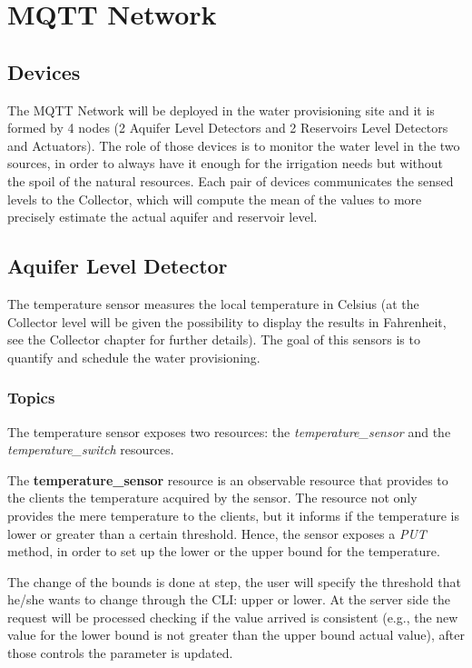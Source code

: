 \section{MQTT Network}

\subsection{Devices}
The MQTT Network will be deployed in the water provisioning site and it is formed by 4 nodes (2 Aquifer Level Detectors and 2 Reservoirs Level Detectors and Actuators). The role of those devices is to monitor the water level in the two sources, in order to always have it enough for the irrigation needs but without the spoil of the natural resources. Each pair of devices communicates the sensed levels  to the Collector, which will compute the mean of the values to more precisely estimate the actual aquifer and reservoir level.


\subsection{Aquifer Level Detector}
The temperature sensor measures the local temperature in Celsius (at the Collector level will be given the possibility to display the results in Fahrenheit, see the Collector chapter for further details). The goal of this sensors is to quantify and schedule the water provisioning.

\subsubsection{Topics}
The temperature sensor exposes two resources: the \textit{temperature\_sensor} and the \textit{temperature\_switch} resources.

The \textbf{temperature\_sensor} resource is an observable resource that provides to the clients the temperature acquired by the sensor. The resource not only provides the mere temperature to the clients, but it informs if the temperature is lower or greater than a certain threshold. Hence, the sensor exposes a  \textit{PUT} method, in order to set up the lower or the upper bound for the temperature.

The change of the bounds is done at step, the user will specify the threshold that he/she wants to change through the CLI: upper or lower. At the server side the request will be processed checking if the value arrived is consistent (e.g., the new value for the lower bound is not greater than the upper bound actual value), after those controls the parameter is updated.

